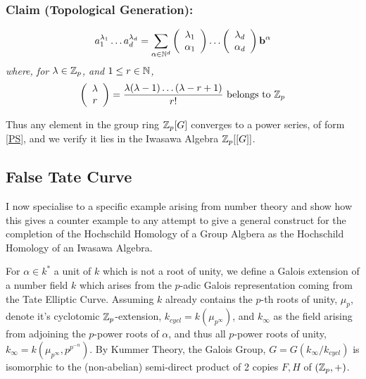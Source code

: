 \subsubsection{Claim (Topological Generation):}
\emph{$$a_1^{\lambda_1}\dots a_d^{\lambda_d} = \sum_{\alpha\in\mathbb N^d}
\left(\begin{array}{c}\lambda_1\\ \alpha_1\\ \end{array}\right)  \dots \left(\begin{array}{c}\lambda_d\\ \alpha_d\\ \end{array}\right) \mathbf b^{\alpha}$$ where, for $\lambda\in\mathbb Z_p$, and $1\leq r\in\mathbb N$, 
$$\left( \begin{array}{c}\lambda\\ r\\ \end{array}\right)  = \frac{\lambda (\lambda - 1)\dots (\lambda-r+1)}{r!} \text{ belongs to }\mathbb Z_p$$}

Thus any element in the group ring $\mathbb Z_p [G]$ converges to a power series, of form \ref{PS}, and we verify it lies in the Iwasawa Algebra $\mathbb Z_p[[G]]$.

\subsection{False Tate Curve\label{false tate}}
I now specialise to a specific example arising from number theory and show how this gives a counter example to any attempt to give a general construct for the completion of the Hochschild Homology of a Group Algbera as the Hochschild Homology of an Iwasawa Algebra.

For $\alpha\in k^*$ a unit of $k$ which is not a root of unity, we define a Galois extension of a number field $k$ which arises from the $p$-adic Galois representation coming from the Tate Elliptic Curve. Assuming $k$ already contains the $p$-th roots of unity, $\mu_p$, denote it's cyclotomic $\mathbb Z_p$-extension, $k_{cycl} = k(\mu_{p^\infty})$, and $k_\infty$ as the field arising from adjoining the $p$-power roots of $\alpha$, and thus all $p$-power roots of unity, $k_\infty = k(\mu_{p^\infty} , p^{p^{-n}})$. By Kummer Theory, the Galois Group, $G= G(k_\infty / k_{cycl})$ is isomorphic to the (non-abelian) semi-direct product of 2 copies $F,H$ of $(\mathbb Z_p,+)$. 

